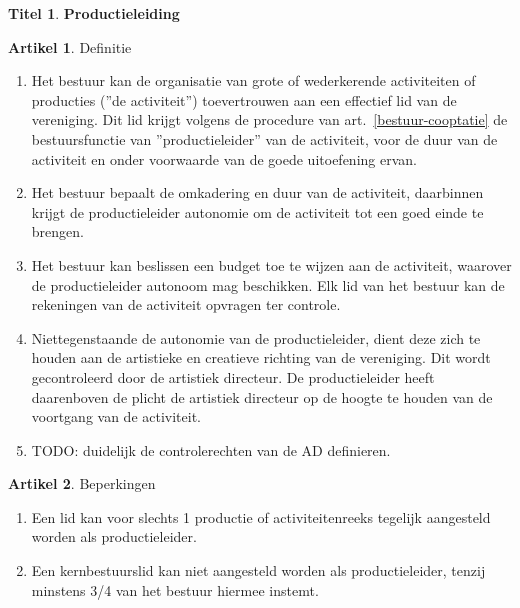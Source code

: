 \documentclass[a4paper,10pt]{article}
\theoremstyle{definition}
\newtheorem{titel}{\newline\Large Titel}
\newtheorem{artikelbase}{\large Artikel}
\newenvironment{artikel}
  {\begin{artikelbase}}
  {\smallskip
   \end{artikelbase}}
\newcommand{\ttext}[1]{\Large \textbf{#1} \normalsize}
\newcommand{\ttextenum}{\mbox{}}
\begin{document}
\begin{titel}\ttext{Productieleiding}

  \begin{artikel}Definitie\label{bestuur-productie}\ttextenum
    \begin{enumerate}
      \item
        Het bestuur kan de organisatie van grote of wederkerende activiteiten of producties (''de activiteit'') toevertrouwen aan een effectief lid van de vereniging.
        Dit lid krijgt volgens de procedure van art.~\ref{bestuur-cooptatie} de bestuursfunctie van ''productieleider'' van de activiteit, voor de duur van de activiteit en onder voorwaarde van de goede uitoefening ervan.
      \item
        Het bestuur bepaalt de omkadering en duur van de activiteit, daarbinnen krijgt de productieleider autonomie om de activiteit tot een goed einde te brengen.
      \item
        Het bestuur kan beslissen een budget toe te wijzen aan de activiteit, waarover de productieleider autonoom mag beschikken.
        Elk lid van het bestuur kan de rekeningen van de activiteit opvragen ter controle.
      \item
        Niettegenstaande de autonomie van de productieleider, dient deze zich te houden aan de artistieke en creatieve richting van de vereniging.
        Dit wordt gecontroleerd door de artistiek directeur.
        De productieleider heeft daarenboven de plicht de artistiek directeur op de hoogte te houden van de voortgang van de activiteit.
      \item
        TODO: duidelijk de controlerechten van de AD definieren.
    \end{enumerate}
  \end{artikel}

  \begin{artikel}Beperkingen\ttextenum
    \begin{enumerate}
      \item
        Een lid kan voor slechts 1 productie of activiteitenreeks tegelijk aangesteld worden als productieleider.
      \item
        Een kernbestuurslid kan niet aangesteld worden als productieleider, tenzij minstens 3/4 van het bestuur hiermee instemt.
    \end{enumerate}
  \end{artikel}
  

\end{titel}
\end{document}
